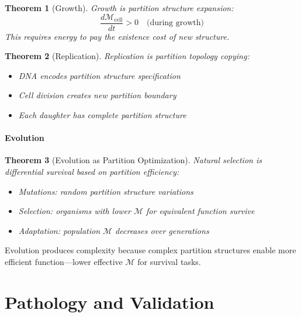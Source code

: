 ﻿\documentclass[twocolumn,10pt,a4paper]{article}
\newtheorem{theorem}{Theorem}[section]
\theoremstyle{definition}
\theoremstyle{remark}
\newcommand{\Depth}{\mathcal{M}}
\begin{document}
\begin{theorem}[Growth]
\label{thm:growth}
Growth is partition structure expansion:
\begin{equation}
    \frac{d\Depth_{\mathrm{cell}}}{dt} > 0 \quad \text{(during growth)}
\end{equation}
This requires energy to pay the existence cost of new structure.
\end{theorem}

\begin{theorem}[Replication]
\label{thm:replication}
Replication is partition topology copying:
\begin{itemize}
    \item DNA encodes partition structure specification
    \item Cell division creates new partition boundary
    \item Each daughter has complete partition structure
\end{itemize}
\end{theorem}

\subsection{Evolution}

\begin{theorem}[Evolution as Partition Optimization]
\label{thm:evolution}
Natural selection is differential survival based on partition efficiency:
\begin{itemize}
    \item Mutations: random partition structure variations
    \item Selection: organisms with lower $\Depth$ for equivalent function survive
    \item Adaptation: population $\Depth$ decreases over generations
\end{itemize}
\end{theorem}

Evolution produces complexity because complex partition structures enable more efficient function---lower effective $\Depth$ for survival tasks.



\part{Pathology and Validation}
\end{document}
